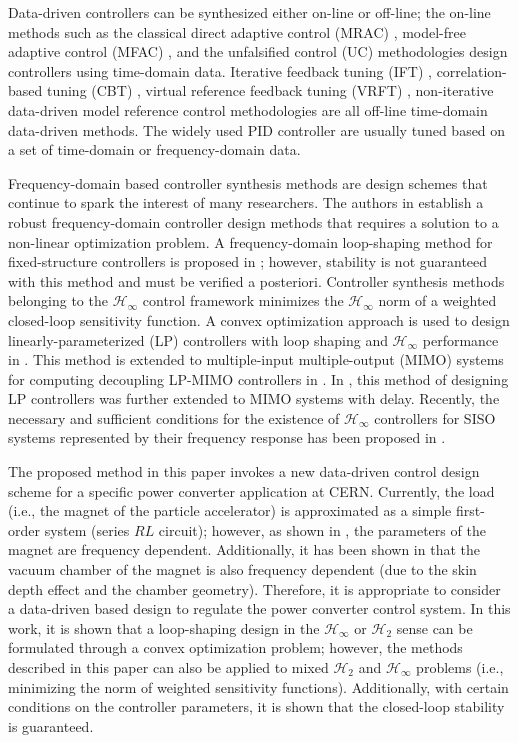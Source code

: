\documentclass[a4paper, 10pt, conference]{ieeeconf}
\begin{document}
Data-driven controllers can be synthesized either on-line or off-line; the on-line methods such as the classical direct adaptive control (MRAC) \cite{LLMK11}, model-free adaptive control (MFAC) \cite{HJ13}, and the unfalsified control (UC) \cite{ST97} methodologies design controllers using time-domain data. Iterative feedback tuning (IFT) \cite{Hja02}, correlation-based tuning (CBT) \cite{KMB02a}, virtual reference feedback tuning (VRFT) \cite{CLS02}, non-iterative data-driven model reference control \cite{KVB07} methodologies are all off-line time-domain data-driven methods.  The widely used PID controller are usually tuned based on a set of time-domain or frequency-domain data. 

Frequency-domain based controller synthesis methods are design schemes that continue to spark the interest of many researchers. The authors in \cite{KNND13b} establish a robust frequency-domain controller design methods that requires a solution to a non-linear optimization problem. A frequency-domain loop-shaping method for fixed-structure controllers is proposed in \cite{KNND13c}; however, stability is not guaranteed with this method and must be verified a posteriori. Controller synthesis methods belonging to the $\mathcal{H}_{\infty}$ control framework minimizes the $\mathcal{H}_{\infty}$ norm of a weighted closed-loop sensitivity function. A convex optimization approach is used to design linearly-parameterized (LP) controllers with loop shaping and $\mathcal{H}_{\infty}$ performance in \cite{KG10}. This method is extended to multiple-input multiple-output (MIMO) systems for computing decoupling LP-MIMO controllers in \cite{GKL10b}. In \cite{NK14}, this method of designing LP controllers was further extended to MIMO systems with delay. Recently, the necessary and sufficient conditions for the existence of $\mathcal{H}_{\infty}$ controllers for SISO systems represented by their frequency response has been proposed in \cite{KNZ16}.

The proposed method in this paper invokes a new data-driven control design scheme for a specific power converter application at CERN. Currently, the load (i.e., the magnet of the particle accelerator) is approximated as a simple first-order system (series $RL$ circuit); however, as shown in \cite{GB65}, the parameters of the magnet are frequency dependent. Additionally, it has been shown in \cite{KZ98} that the vacuum chamber of the magnet is also frequency dependent (due to the skin depth effect and the chamber geometry). Therefore, it is appropriate to consider a data-driven based design to regulate the power converter control system.  In this work, it is shown that a loop-shaping design in the $\mathcal{H}_\infty$ or $\mathcal{H}_2$ sense can be formulated through a convex optimization problem; however, the methods described in this paper can also be applied to mixed $\mathcal{H}_2$ and $\mathcal{H}_\infty$ problems (i.e., minimizing the norm of weighted sensitivity functions). Additionally, with certain conditions on the controller parameters, it is shown that the closed-loop stability is guaranteed. 
\end{document}
